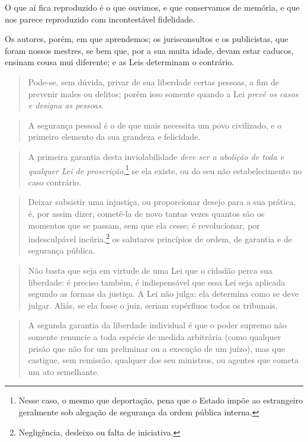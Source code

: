 O que aí fica reproduzido é o que ouvimos, e que conservamos de memória,
e que nos parece reproduzido com incontestável fidelidade.

Os autores, porém, em que aprendemos; os jurisconsultos e os
publicistas, que foram nossos mestres, se bem que, por a sua muita
idade, devam estar caducos, ensinam cousa mui diferente; e as Leis
determinam o contrário.

\begin{quote}
Pode-se, sem dúvida, privar de sua liberdade certas pessoas, a fim de
prevenir males ou delitos; porém isso somente quando a Lei \emph{prevê
os casos e designa as pessoas}.
\end{quote}

\begin{quote}
A segurança pessoal é o de que mais necessita um povo civilizado, e o
primeiro elemento da sua grandeza e felicidade.
\end{quote}

\begin{quote}
A primeira garantia desta inviolabilidade \emph{deve ser a abolição
de toda e qualquer Lei de proscrição},\footnote{Nesse caso, o mesmo
que deportação, pena que o Estado impõe ao estrangeiro geralmente
sob alegação de segurança da ordem pública interna.} se ela existe,
ou do seu não estabelecimento no caso contrário.
  \end{quote}

\begin{quote}
Deixar subsistir uma injustiça, ou proporcionar desejo para a sua
prática, é, por assim dizer, cometê-la de novo tantas vezes quantos
são os momentos que se passam, sem que ela cesse; é revolucionar, por
indesculpável incúria,\footnote{Negligência, desleixo ou falta de
iniciativa.} os salutares princípios de ordem, de garantia e de
segurança pública.
\end{quote}

\begin{quote}
Não basta que seja em virtude de uma Lei que o cidadão perca sua
liberdade: é preciso também, é indispensável que essa Lei seja
aplicada segundo as formas da justiça. A Lei não julga: ela determina
como se deve julgar. Aliás, se ela fosse o juiz, seriam supérfluos
todos os tribunais.
\end{quote}

\begin{quote}
A segunda garantia da liberdade individual é que o poder supremo não
somente renuncie a toda espécie de medida arbitrária (como qualquer
prisão que não for um preliminar ou a execução de um juízo), mas que
castigue, sem remissão, qualquer dos seu ministros, ou agentes que
cometa um ato semelhante.
\end{quote}

